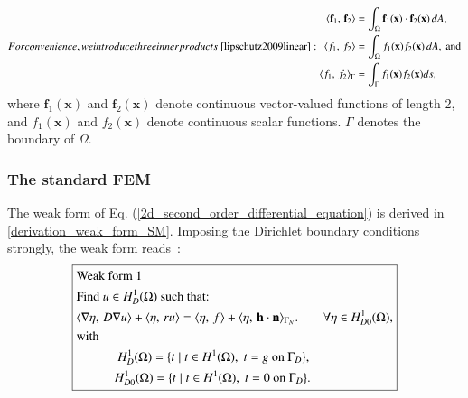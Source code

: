 \documentclass[review,3p]{elsarticle}
\begin{document}
\begin{subequations}
For convenience, we introduce three inner products~\cite{lipschutz2009linear}:
  \begin{align}
   \langle \mathbf{f}_1, \,\mathbf{f}_2 \rangle &= \int _{\Omega} \mathbf{f}_1(\mathbf{x}) \cdot \mathbf{f}_2(\mathbf{x}) \, d A,	\\
   \langle f_1, \,f_2 \rangle &= \int _{\Omega} f_1(\mathbf{x}) f_2(\mathbf{x}) \, d A,	\text{ and}\\
   \langle f_1, \,f_2 \rangle _{\Gamma} &= \int _{\Gamma} f_1(\mathbf{x}) f_2(\mathbf{x}) ds,
  \end{align}
\end{subequations}
where $\mathbf{f}_1(\mathbf{x})$ and $\mathbf{f}_2(\mathbf{x})$ denote continuous vector-valued functions of length 2, and $f_1(\mathbf{x})$ and $f_2(\mathbf{x})$ denote continuous scalar functions. $\Gamma$ denotes the boundary of $\Omega$.



\subsubsection{The standard FEM}

The weak form of Eq. (\ref{2d_second_order_differential_equation}) is derived in \ref{derivation_weak_form_SM}. Imposing the Dirichlet boundary conditions strongly, the weak form reads~\cite{chen2005finite}:
\begin{equation}
\centering
\boxed{ 
\begin{aligned}
&\text{Weak~form}~ 1 ~~~~~~~~~\\
&\text{Find $u \in H _D^1 (\Omega)$ such that:} \\
& \langle {\nabla \eta}, \, D \nabla u \rangle + \langle \eta, \, ru \rangle = \langle \eta, \, f \rangle + \langle \eta, \, \mathbf{h} \cdot \mathbf{n} \rangle_{ {\Gamma_N}}. \qquad \forall \eta \in H _{D0}^1 (\Omega),\\
&\text{with} \\
&~~~~~~~~~~~~~H_{D} ^1 (\Omega) = \{t \; | \; t \in H^1 (\Omega), \; t = g \text{ on } \Gamma _D \},  \\
&~~~~~~~~~~~~H_{D0} ^1 (\Omega) = \{t \; | \; t \in H^1 (\Omega), \; t = 0 \text{ on } \Gamma _D\}.\\
\end{aligned}		\label{sm_weak_form_Diri_strong} 
}
\end{equation}
\end{document}
